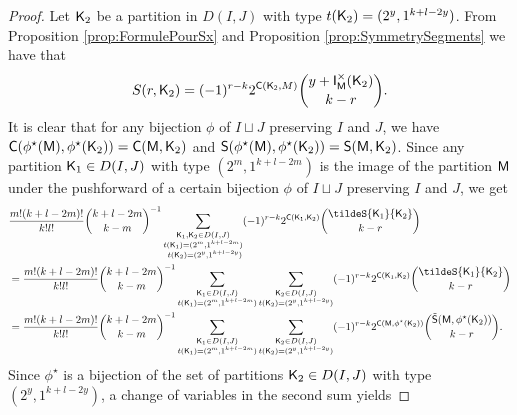\documentclass[11pt, a4paper, oneside, reqno]{amsart}
\newcommand{\sK}{{\sf K}}
\newcommand{\setK}{{D(I,J)}}
\newcommand{\sM}{{\sf M}}
\theoremstyle{remark}
\theoremstyle{definition}
\numberwithin{equation}{section}
\begin{document}
\begin{proof}
	Let $\sK_2$ be a partition in $\setK$ with type $t(\sK_2) = (2^y,1^{k+l-2y})$. From Proposition \ref{prop:FormulePourSx} and Proposition \ref{prop:SymmetrySegments} we have that
	$$
		S(r,{\sK}_2) = (-1)^{r-k}2^{{\sf C}({\sf K_2}, M)}\binom{y+{\sf I}^{\times}_{{\sM}}({\sK}_2)}{k-r}.
	$$
	It is clear that for any  bijection  $\phi$ of $I\sqcup J$ preserving $I$ and $J$, we have ${\sf C}(\phi^{\star}({\sM}),\phi^{\star}({\sK}_2)) = {\sf C}({\sM},{\sK}_2)$ and ${\sf S}(\phi^{\star}({\sM}),\phi^{\star}({\sK}_2)) = {\sf S}({\sM},{\sK}_2)$. Since any partition ${\sK_1} \in \setK$ with type $(2^m,1^{k+l-2m})$ is the image of the partition $\sM$ under the pushforward of a certain bijection $\phi$ of $I\sqcup J$ preserving $I$ and $J$, we get
	\begin{align*}
		 & \frac{m!(k+l-2m)!}{k!l!}\binom{k+l-2m}{k-m}^{-1}\sum_{\substack{{\sK_1, \sK_2} \in \setK \\ {t({\sK}_1)}=(2^m,1^{k+l-2m}) \\  {t({\sK}_2)}=(2^y,1^{k+l-2y})}} (-1)^{r-k}2^{{\sf C}({\sK_1},{\sK_2})} \binom{\tildeS{{\sK}_1}{{\sK}_2}}{k-r} \\
		 & =\frac{m!(k+l-2m)!}{k!l!}\binom{k+l-2m}{k-m}^{-1}\sum_{\substack{{\sK_1} \in \setK          \\  {t({\sK}_1)}=(2^m,1^{k+l-2m})}}\sum_{\substack{{\sK_2} \in \setK\\  {t({\sK}_2)}=(2^y,1^{k+l-2y})}} (-1)^{r-k}2^{{\sf C}({\sK_1},{\sK_2})}\binom{\tildeS{{\sK}_1}{{\sK}_2}}{k-r} \\
		 & =\frac{m!(k+l-2m)!}{k!l!}\binom{k+l-2m}{k-m}^{-1} \sum_{\substack{{\sK_1} \in \setK        \\  {t({\sK}_1)}=(2^m,1^{k+l-2m})}} \sum_{\substack{{\sK_2} \in \setK\\  {t({\sK}_2)}=(2^y,1^{k+l-2y})}}(-1)^{r-k}2^{{\sf C}({\sM},\phi^{\star}({\sK}_2))} \binom{\tilde{{\sf S}}({\sM},\phi^{\star}({\sK}_2))}{k-r}.
	\end{align*}
	 Since $\phi^{\star}$ is a bijection of the set of partitions ${\sK}_2 \in \setK$ with type $(2^y,1^{k+l-2y})$, a change of variables in the second sum yields


\end{proof}
\end{document}

